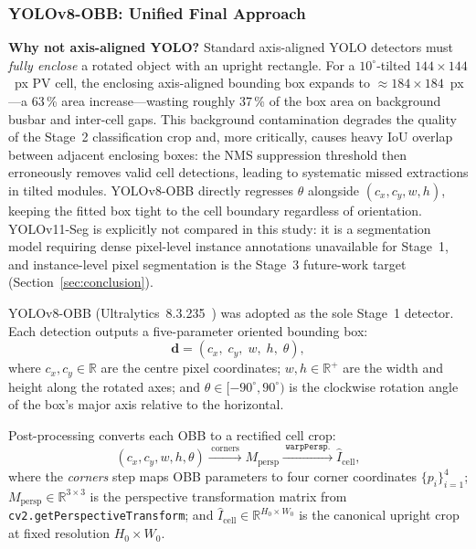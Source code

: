 \documentclass[conference]{IEEEtran}
\begin{document}
\subsubsection{YOLOv8-OBB: Unified Final Approach}
\label{sec:yolo}

\textbf{Why not axis-aligned YOLO?} Standard axis-aligned YOLO detectors must \textit{fully enclose} a rotated object with an upright rectangle. For a $10^\circ$-tilted $144\times144$~px PV cell, the enclosing axis-aligned bounding box expands to $\approx$$\!184\times184$~px---a 63\,\% area increase---wasting roughly 37\,\% of the box area on background busbar and inter-cell gaps. This background contamination degrades the quality of the Stage~2 classification crop and, more critically, causes heavy IoU overlap between adjacent enclosing boxes: the NMS suppression threshold then erroneously removes valid cell detections, leading to systematic missed extractions in tilted modules. YOLOv8-OBB directly regresses $\theta$ alongside $(c_x, c_y, w, h)$, keeping the fitted box tight to the cell boundary regardless of orientation. YOLOv11-Seg is explicitly not compared in this study: it is a segmentation model requiring dense pixel-level instance annotations unavailable for Stage~1, and instance-level pixel segmentation is the Stage~3 future-work target (Section~\ref{sec:conclusion}).

YOLOv8-OBB (Ultralytics~8.3.235~\cite{jocher2023}) was adopted as the sole Stage~1 detector. Each detection outputs a five-parameter oriented bounding box:
\begin{equation}
  \mathbf{d} = (c_x,\; c_y,\; w,\; h,\; \theta),
  \label{eq:obb}
\end{equation}
where $c_x, c_y \in \mathbb{R}$ are the centre pixel coordinates; $w, h \in \mathbb{R}^{+}$ are the width and height along the rotated axes; and $\theta \in [-90^\circ, 90^\circ)$ is the clockwise rotation angle of the box's major axis relative to the horizontal.

Post-processing converts each OBB to a rectified cell crop:
\begin{equation}
  (c_x, c_y, w, h, \theta)
  \xrightarrow{\;\text{corners}\;}
  M_{\text{persp}}
  \xrightarrow{\;\texttt{warpPersp.}\;}
  \hat{I}_{\text{cell}},
  \label{eq:postproc}
\end{equation}
where the \textit{corners} step maps OBB parameters to four corner coordinates $\{p_i\}_{i=1}^{4}$; $M_{\text{persp}} \in \mathbb{R}^{3\times3}$ is the perspective transformation matrix from \texttt{cv2.getPerspectiveTransform}; and $\hat{I}_{\text{cell}} \in \mathbb{R}^{H_0 \times W_0}$ is the canonical upright crop at fixed resolution $H_0 \times W_0$.
\end{document}
